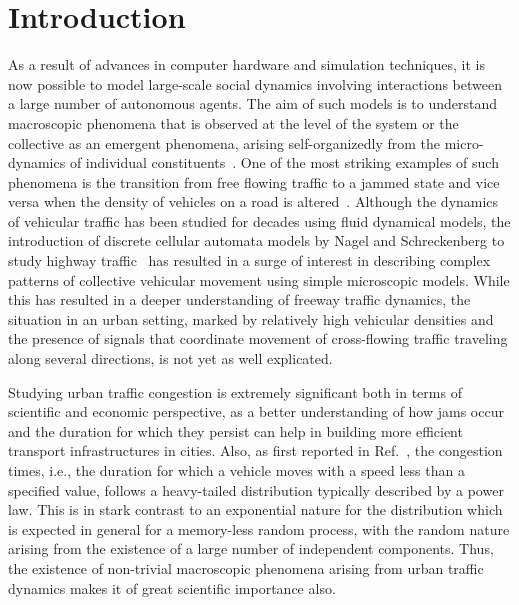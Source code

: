 \documentclass[conference]{IEEEtran}
\begin{document}
\IEEEpeerreviewmaketitle


\section{Introduction}

As a result of advances in computer hardware and simulation
techniques, it is now possible to model large-scale social dynamics
involving interactions between a large number of
autonomous agents. The aim of such models is to understand macroscopic
phenomena that is observed at the level of the system or the
collective as an emergent phenomena, arising self-organizedly 
from the micro-dynamics of individual constituents~\cite{Ball2003}.
One of the most striking examples of such phenomena is the 
transition from free flowing traffic to a
jammed state and vice versa when the density of vehicles on a road is
altered~\cite{Helbing2001,Chakrabarti2007}.
Although the dynamics of vehicular traffic has been studied for
decades using fluid dynamical models, the introduction of
discrete cellular automata models by Nagel and Schreckenberg to study
highway traffic~\cite{Nagel1992} has resulted in a surge of interest
in describing complex patterns of collective vehicular movement 
using simple microscopic models. While this has resulted in a deeper
understanding of freeway traffic dynamics, the situation in an urban
setting,
marked by relatively high vehicular densities and the presence of
signals that coordinate movement of cross-flowing traffic traveling
along several directions, is not yet as well explicated.

Studying urban traffic congestion is extremely significant both in
terms of scientific and economic perspective, as a better
understanding of how jams occur and the duration for which they
persist can help in building more efficient transport infrastructures
in cities. Also, as first reported in Ref.~\cite{Majith2015}, the
congestion times, i.e., the duration for which a vehicle moves with a
speed less than a specified value, follows a heavy-tailed distribution
typically described by a power law. This is in stark contrast to an
exponential nature for the distribution which is expected in general
for a memory-less random process, with the random nature arising from
the existence of a large number of independent
components. Thus, the existence
of non-trivial macroscopic phenomena arising from urban traffic
dynamics makes it of great scientific importance also.
\end{document}

